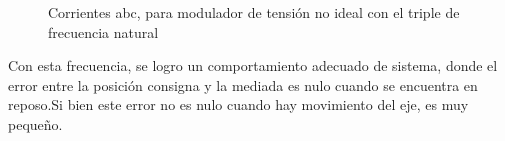 \documentclass[a4paper, 10pt, onecolumn,journal]{ieeeconf}
\begin{document}
\begin{figure}[H]
	\centering
	\begin{adjustbox}{max width=\columnwidth}
	\end{adjustbox}
	\caption{Corrientes abc, para modulador de tensión no ideal con el triple de frecuencia natural}
	\label{Corrientes abc, para modulador de tensión no ideal con el triple de frecuencia natural}
\end{figure}
Con esta frecuencia, se logro un comportamiento adecuado de sistema, donde el error entre la posición consigna y la mediada es nulo cuando se encuentra en reposo.Si bien este error no es nulo cuando hay movimiento del eje, es muy pequeño.
\end{document}
